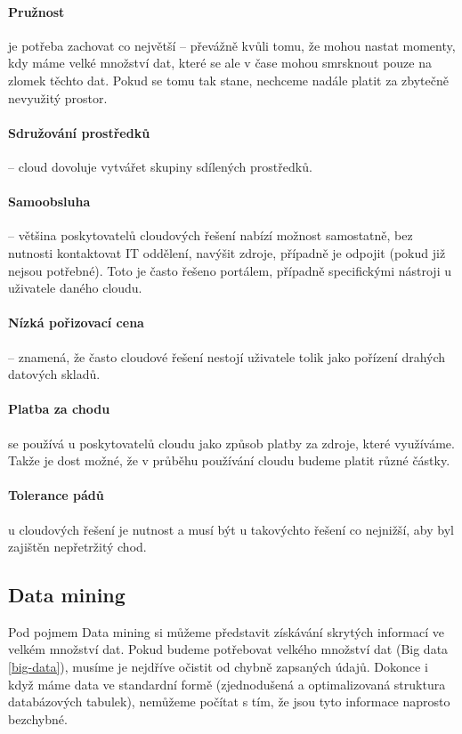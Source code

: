 \paragraph{Pružnost} je potřeba zachovat co největší -- převážně kvůli tomu, že mohou nastat momenty, kdy máme velké množství dat, které se ale v čase mohou smrsknout pouze na zlomek těchto dat. Pokud se tomu tak stane, nechceme nadále platit za zbytečně nevyužitý prostor. \cite{big-data-dummies}

\paragraph{Sdružování prostředků} -- cloud dovoluje vytvářet skupiny sdílených prostředků. \cite{big-data-dummies}

\paragraph{Samoobsluha} -- většina poskytovatelů cloudových řešení nabízí možnost samostatně, bez nutnosti kontaktovat IT oddělení, navýšit zdroje, případně je odpojit (pokud již nejsou potřebné). Toto je často řešeno portálem, případně specifickými nástroji u uživatele daného cloudu. \cite{big-data-dummies}

\paragraph{Nízká pořizovací cena} -- znamená, že často cloudové řešení nestojí uživatele tolik jako pořízení drahých datových skladů. \cite{big-data-dummies}

\paragraph{Platba za chodu} se používá u poskytovatelů cloudu jako způsob platby za zdroje, které využíváme. Takže je dost možné, že v průběhu používání cloudu budeme platit různé částky. \cite{big-data-dummies}

\paragraph{Tolerance pádů} u cloudových řešení je nutnost a musí být u takovýchto řešení co nejnižší, aby byl zajištěn nepřetržitý chod. \cite{big-data-dummies}

\subsection{Data mining} \label{data-mining}
\par Pod pojmem Data mining si můžeme představit získávání skrytých informací ve velkém množství dat. Pokud budeme potřebovat velkého množství dat (Big data \ref{big-data}), musíme je nejdříve očistit od chybně zapsaných údajů. Dokonce i když máme data ve standardní formě (zjednodušená a optimalizovaná struktura databázových tabulek), nemůžeme počítat s tím, že jsou tyto informace naprosto bezchybné.\cite{data-mining-principles}

